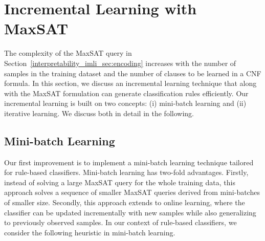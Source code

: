 \section{Incremental Learning with MaxSAT}
\label{interpretability_imli_sec:incremental_learning} 
The complexity of the MaxSAT query in Section~\ref{interpretability_imli_sec:encoding} increases with the number of samples in the training dataset and the number of clauses to be learned in a CNF formula. In this section, we discuss an incremental learning technique that along with the MaxSAT formulation can generate classification rules efficiently. Our incremental learning is built on two concepts: (i)
mini-batch learning and (ii) iterative learning. We discuss both in detail in the following.

\subsection{Mini-batch Learning} 

Our first improvement is to implement a mini-batch learning technique tailored for rule-based classifiers. Mini-batch learning has two-fold advantages. Firstly, instead of solving a large MaxSAT query for the whole training data, this approach solves a sequence of smaller MaxSAT queries derived from mini-batches of smaller size.  Secondly, this approach extends to online learning, where the classifier can be updated incrementally with new samples while also generalizing to previously observed samples. In our context of rule-based classifiers, we consider the following heuristic in mini-batch learning.


